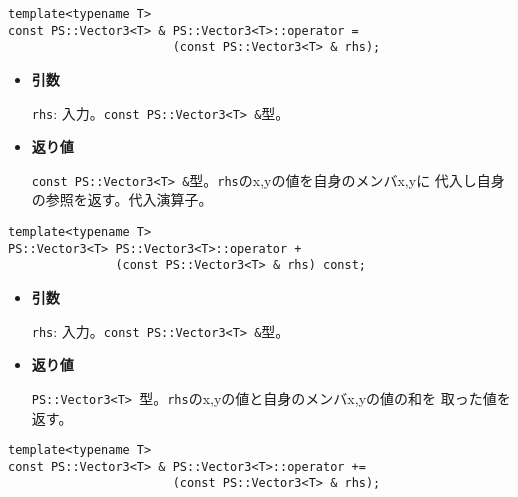 \mbox{}

\begin{screen}
\begin{verbatim}
template<typename T>
const PS::Vector3<T> & PS::Vector3<T>::operator = 
                       (const PS::Vector3<T> & rhs);
\end{verbatim}
\end{screen}

\begin{itemize}

\item{{\bf 引数}}

{\tt rhs}: 入力。{\tt const PS::Vector3<T> \&}型。

\item{{\bf 返り値}}

{\tt const PS::Vector3<T> \&}型。{\tt rhs}のx,yの値を自身のメンバx,yに
代入し自身の参照を返す。代入演算子。

\end{itemize}


\mbox{}

\begin{screen}
\begin{verbatim}
template<typename T>
PS::Vector3<T> PS::Vector3<T>::operator + 
               (const PS::Vector3<T> & rhs) const;
\end{verbatim}
\end{screen}

\begin{itemize}

\item{{\bf 引数}}

{\tt rhs}: 入力。{\tt const PS::Vector3<T> \&}型。

\item{{\bf 返り値}}

{\tt PS::Vector3<T> }型。{\tt rhs}のx,yの値と自身のメンバx,yの値の和を
取った値を返す。

\end{itemize}


\begin{screen}
\begin{verbatim}
template<typename T>
const PS::Vector3<T> & PS::Vector3<T>::operator += 
                       (const PS::Vector3<T> & rhs);
\end{verbatim}
\end{screen}


